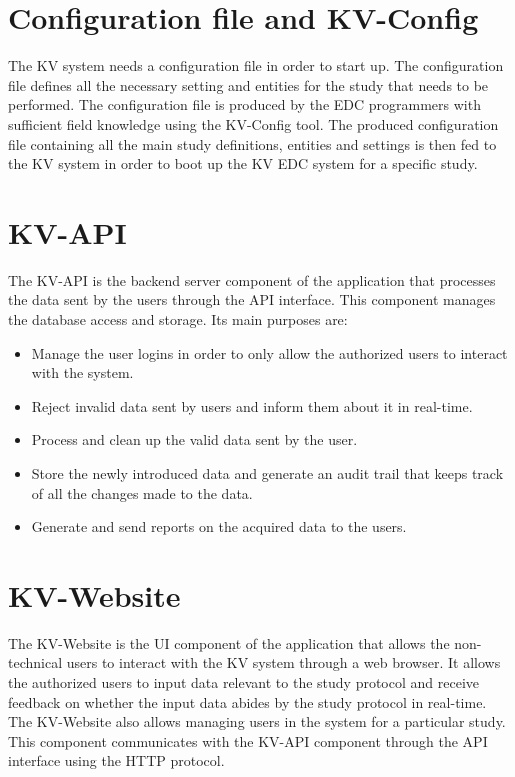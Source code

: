 \documentclass[11pt,a4paper,oneside]{article}
\begin{document}
\section{Configuration file and KV-Config}
The KV system needs a configuration file in order to start up. The configuration file defines all the necessary setting and entities for the study that needs to be performed. The configuration file is produced by the EDC programmers with sufficient field knowledge using the KV-Config tool. The produced configuration file containing all the main study definitions, entities and settings is then fed to the KV system in order to boot up the KV EDC system for a specific study.

\section{KV-API}
The KV-API is the backend server component of the application that processes the data sent by the users through the API interface. This component manages the database access and storage. Its main purposes are:

\begin{itemize}
	\item Manage the user logins in order to only allow the authorized users to interact with the system.
	\item Reject invalid data sent by users and inform them about it in real-time.
	\item Process and clean up the valid data sent by the user.
	\item Store the newly introduced data and generate an audit trail that keeps track of all the changes made to the data.
	\item Generate and send reports on the acquired data to the users.
\end{itemize}

\section{KV-Website}
The KV-Website is the UI component of the application that allows the non-technical users to interact with the KV system through a web browser. It allows the authorized users to input data relevant to the study protocol and receive feedback on whether the input data abides by the study protocol in real-time. The KV-Website also allows managing users in the system for a particular study. This component communicates with the KV-API component through the API interface using the HTTP protocol.
\end{document}

